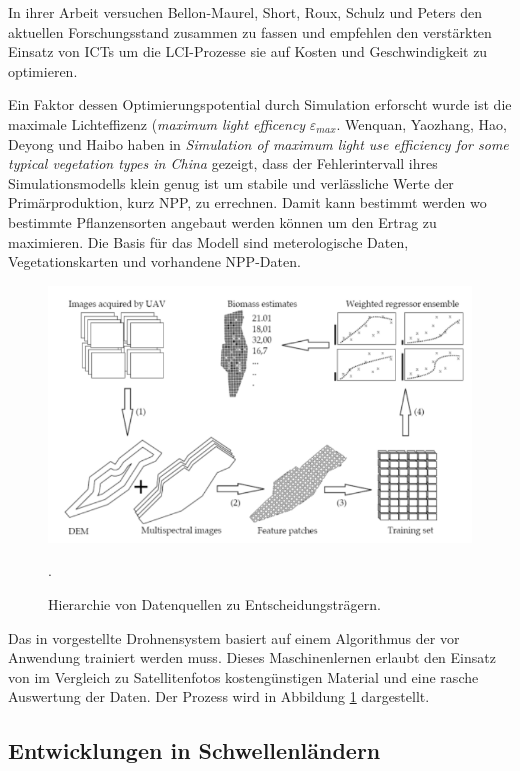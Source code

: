 In ihrer Arbeit versuchen Bellon-Maurel, Short, Roux, Schulz und Peters den aktuellen Forschungsstand zusammen zu fassen und empfehlen den verstärkten Einsatz von ICTs um die LCI-Prozesse sie auf Kosten und Geschwindigkeit zu optimieren.\cite{jour:Bellon-Maurel2014}

Ein Faktor dessen Optimierungspotential durch Simulation erforscht wurde ist die maximale Lichteffizenz (\textit{maximum light efficency} $\varepsilon_{max}$. Wenquan, Yaozhang, Hao, Deyong und Haibo haben in \textit{Simulation of maximum light use efficiency for some typical vegetation types in China} gezeigt, dass der Fehlerintervall ihres Simulationsmodells klein genug ist um stabile und verlässliche Werte der Primärproduktion, kurz NPP, zu errechnen.  Damit kann bestimmt werden wo bestimmte Pflanzensorten angebaut werden können um den Ertrag zu maximieren. Die Basis für das Modell sind meterologische Daten, Vegetationskarten und vorhandene NPP-Daten.  \cite{jour:Zhu2006}

\begin{figure}[h]
 \includegraphics[scale=0.6,natwidth=\textwidth]{figures/designtools/uav_workflow.png}
 \centering
 \label{fig:uav_workflow}
 \caption{Hierarchie von Datenquellen zu Entscheidungsträgern. \cite{jour:Wang2013}}.
\end{figure}

Das in \cite{jour:Honkavaara2012} vorgestellte Drohnensystem basiert auf einem Algorithmus der vor Anwendung trainiert werden muss. Dieses Maschinenlernen erlaubt den Einsatz von im Vergleich zu Satellitenfotos kostengünstigen Material und eine rasche Auswertung der Daten. Der Prozess wird in Abbildung \ref{fig:uav_workflow} dargestellt.

\subsection{Entwicklungen in Schwellenländern}

